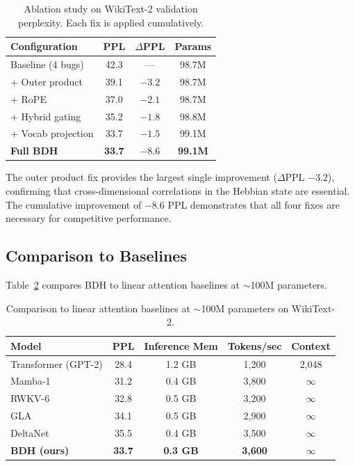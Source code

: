 \documentclass{article}
\begin{document}
\begin{table}[t]
    \centering
    \caption{Ablation study on WikiText-2 validation perplexity. Each fix is applied cumulatively.}
    \label{tab:ablation}
    \begin{tabular}{@{}lccc@{}}
        \toprule
        \textbf{Configuration} & \textbf{PPL} & \textbf{$\Delta$PPL} & \textbf{Params} \\
        \midrule
        Baseline (4 bugs) & 42.3 & --- & 98.7M \\
        + Outer product & 39.1 & $-3.2$ & 98.7M \\
        + RoPE & 37.0 & $-2.1$ & 98.7M \\
        + Hybrid gating & 35.2 & $-1.8$ & 98.8M \\
        + Vocab projection & 33.7 & $-1.5$ & 99.1M \\
        \textbf{Full BDH} & \textbf{33.7} & \textbf{$-8.6$} & \textbf{99.1M} \\
        \bottomrule
    \end{tabular}
\end{table}

The outer product fix provides the largest single improvement ($\Delta$PPL $-3.2$), confirming that cross-dimensional correlations in the Hebbian state are essential. The cumulative improvement of $-8.6$ PPL demonstrates that all four fixes are necessary for competitive performance.

\subsection{Comparison to Baselines}

Table~\ref{tab:comparison} compares BDH to linear attention baselines at $\sim$100M parameters.

\begin{table}[t]
    \centering
    \caption{Comparison to linear attention baselines at $\sim$100M parameters on WikiText-2.}
    \label{tab:comparison}
    \begin{tabular}{@{}lcccc@{}}
        \toprule
        \textbf{Model} & \textbf{PPL} & \textbf{Inference Mem} & \textbf{Tokens/sec} & \textbf{Context} \\
        \midrule
        Transformer (GPT-2) & 28.4 & 1.2 GB & 1,200 & 2,048 \\
        Mamba-1 & 31.2 & 0.4 GB & 3,800 & $\infty$ \\
        RWKV-6 & 32.8 & 0.5 GB & 3,200 & $\infty$ \\
        GLA & 34.1 & 0.5 GB & 2,900 & $\infty$ \\
        DeltaNet & 35.5 & 0.4 GB & 3,500 & $\infty$ \\
        \textbf{BDH (ours)} & \textbf{33.7} & \textbf{0.3 GB} & \textbf{3,600} & \textbf{$\infty$} \\
        \bottomrule
    \end{tabular}
\end{table}
\end{document}
